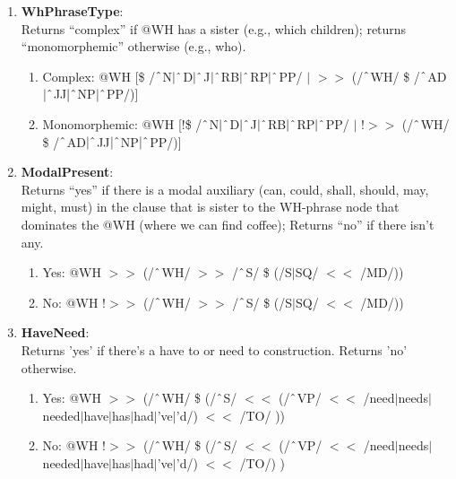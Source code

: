 \begin{enumerate}
    \item \textbf{WhPhraseType}: \\
    Returns ``complex'' if @WH has a sister (e.g., \textsf{which children}); returns ``monomorphemic'' otherwise (e.g., \textsf{who}).
        \begin{enumerate}  
            \item Complex: @WH [\$ /$\string^$N$|\string^$D$|\string^$J$|\string^$RB$|\string^$RP$|\string^$PP/
            $|$ $>\!\!>$ (/$\string^$WH/ \$ /$\string^$AD$|\string^$JJ$|\string^$NP$|\string^$PP/)]

            \item Monomorphemic: @WH [!\$ /$\string^$N$|\string^$D$|\string^$J$|\string^$RB$|\string^$RP$|\string^$PP/
            $|$ !$>\!\!>$ (/$\string^$WH/ \$ /$\string^$AD$|\string^$JJ$|\string^$NP$|\string^$PP/)]
        \end{enumerate}

    \item \textbf{ModalPresent}: \\
    Returns ``yes'' if there is a modal auxiliary (\textsf{can}, \textsf{could}, \textsf{shall}, \textsf{should}, \textsf{may}, \textsf{might}, \textsf{must}) in the clause that is sister to the WH-phrase node that dominates the @WH (\textsf{where we can find coffee}); Returns ``no'' if there isn't any. 
        \begin{enumerate}
            \item Yes: @WH $>\!\!>$ (/$\string^$WH/ $>\!\!>$ /$\string^$S/ \$ (/S$|$SQ/ $<\!\!<$ /MD/))
            \item No: @WH !$>\!\!>$ (/$\string^$WH/  $>\!\!>$ /$\string^$S/ \$ (/S$|$SQ/ $<\!\!<$ /MD/))
        \end{enumerate}
        
    \item \textbf{HaveNeed}:\\
    Returns 'yes' if there's a \textsf{have to} or \textsf{need to} construction. Returns 'no' otherwise.
        \begin{enumerate}
            \item Yes: @WH $>\!\!>$ (/$\string^$WH/ \$ (/$\string^$S/ $<\!\!<$ (/$\string^$VP/ $<\!\!<$ /need$|$needs$|$needed$|$have$|$has$|$had$|$'ve$|$'d/) $<\!\!<$ /TO/ ))

            \item No: @WH !$>\!\!>$ (/$\string^$WH/ \$ (/$\string^$S/ $<\!\!<$ (/$\string^$VP/ $<\!\!<$ /need$|$needs$|$needed$|$have$|$has$|$had$|$'ve$|$'d/) $<\!\!<$ /TO/) )


\end{enumerate}
\end{enumerate}
